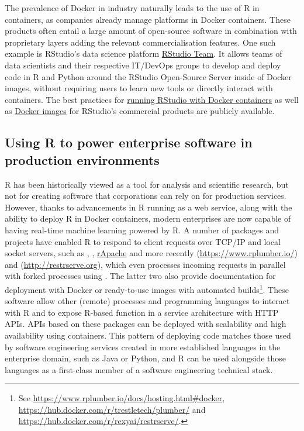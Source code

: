 The prevalence of Docker in industry naturally leads to the use of R in
containers, as companies already manage platforms in Docker containers.
These products often entail a large amount of open-source software in
combination with proprietary layers adding the relevant
commercialisation features. One such example is RStudio's data science
platform \href{https://rstudio.com/products/team/}{RStudio Team}. It
allows teams of data scientists and their respective IT/DevOps groups to
develop and deploy code in R and Python around the RStudio Open-Source
Server inside of Docker images, without requiring users to learn new
tools or directly interact with containers. The best practices for
\href{https://support.rstudio.com/hc/en-us/articles/360021594513-Running-RStudio-with-Docker-containers}{running
RStudio with Docker containers} as well as
\href{https://github.com/rstudio/rstudio-docker-products}{Docker images}
for RStudio's commercial products are publicly available.

\hypertarget{using-r-to-power-enterprise-software-in-production-environments}{%
\subsection{Using R to power enterprise software in production
environments}\label{using-r-to-power-enterprise-software-in-production-environments}}

\label{enterprise}

R has been historically viewed as a tool for analysis and scientific
research, but not for creating software that corporations can rely on
for production services. However, thanks to advancements in R running as
a web service, along with the ability to deploy R in Docker containers,
modern enterprises are now capable of having real-time machine learning
powered by R. A number of packages and projects have enabled R to
respond to client requests over TCP/IP and local socket servers, such as
 \citep{cran_rserve}, 
\citep{grosjean_sciviews_2019}, \href{http://www.rapache.net}{rApache}
and more recently  (\url{https://www.rplumber.io/}) and
 (\url{http://restrserve.org}), which even processes
incoming requests in parallel with forked processes using
. The latter two also provide documentation for
deployment with Docker or ready-to-use images with automated
builds\footnote{See \href{https://www.rplumber.io/docs/hosting.html\#docker}{https://www.rplumber.io/docs/hosting.html\#docker}, \href{https://hub.docker.com/r/trestletech/plumber/}{https://hub.docker.com/r/trestletech/plumber/} and \href{https://hub.docker.com/r/rexyai/restrserve/}{https://hub.docker.com/r/rexyai/restrserve/}.}.
These software allow other (remote) processes and programming languages
to interact with R and to expose R-based function in a service
architecture with HTTP APIs. APIs based on these packages can be
deployed with scalability and high availability using containers. This
pattern of deploying code matches those used by software engineering
services created in more established languages in the enterprise domain,
such as Java or Python, and R can be used alongside those languages as a
first-class member of a software engineering technical stack.

